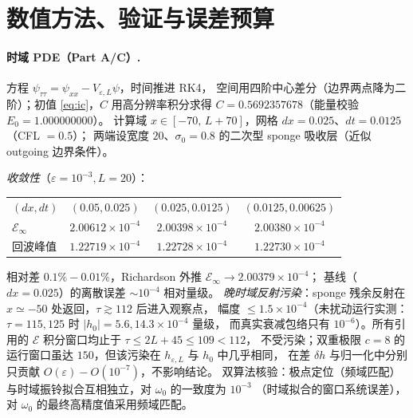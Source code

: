 \section{数值方法、验证与误差预算}
\label{sec:num}

\paragraph{时域 PDE（Part A/C）.}
方程 $\psi_{\tau\tau}=\psi_{xx}-V_{\varepsilon,L}\psi$，时间推进 RK4，
空间用四阶中心差分（边界两点降为二阶）；初值 \eqref{eq:ic}，$C$ 用高分辨率积分求得
$C=0.5692357678$（能量校验 $E_0=1.000000000$）。
计算域 $x\in[-70,\,L+70]$，网格 $dx=0.025$、$dt=0.0125$（CFL $=0.5$）；
两端设宽度 $20$、$\sigma_0=0.8$ 的二次型 sponge 吸收层（近似 outgoing 边界条件）。

\emph{收敛性}（$\varepsilon=10^{-3},L=20$）：
\begin{center}\small
\begin{tabular}{lccc}
\toprule
$(dx,dt)$ & $(0.05,0.025)$ & $(0.025,0.0125)$ & $(0.0125,0.00625)$\\
$\mathcal E_\infty$ & $2.00612\times10^{-4}$ & $2.00398\times10^{-4}$ & $2.00380\times10^{-4}$\\
{回波峰值}& $1.22719\times10^{-4}$ & $1.22728\times10^{-4}$ & $1.22730\times10^{-4}$\\
\bottomrule
\end{tabular}
\end{center}
相对差 $0.1\%\!-\!0.01\%$，Richardson 外推 $\mathcal E_\infty\to2.00379\times10^{-4}$；
基线（$dx=0.025$）的离散误差 $\sim10^{-4}$ 相对量级。
\emph{晚时域反射污染}：sponge 残余反射在 $x\simeq-50$ 处返回，$\tau\gtrsim112$ 后进入观察点，
幅度 $\le1.5\times10^{-4}$（未扰动运行实测：$\tau=115,125$ 时 $|h_0|=5.6,14.3\times10^{-4}$ 量级，
而真实衰减包络只有 $10^{-6}$）。所有引用的 $\mathcal E$ 积分窗口均止于 $\tau\le2L+45\le109<112$，
不受污染；双重极限 $c=8$ 的运行窗口虽达 $150$，但该污染在 $h_{\varepsilon,L}$ 与 $h_0$ 中几乎相同，
在差 $\delta h$ 与归一化中分别只贡献 $O(\varepsilon)\!-\!O(10^{-7})$，不影响结论。
双算法核验：极点定位（频域匹配）与时域振铃拟合互相独立，对 $\omega_0$ 的一致度为 $10^{-3}$
（时域拟合的窗口系统误差），对 $\omega_0$ 的最终高精度值采用频域匹配。


